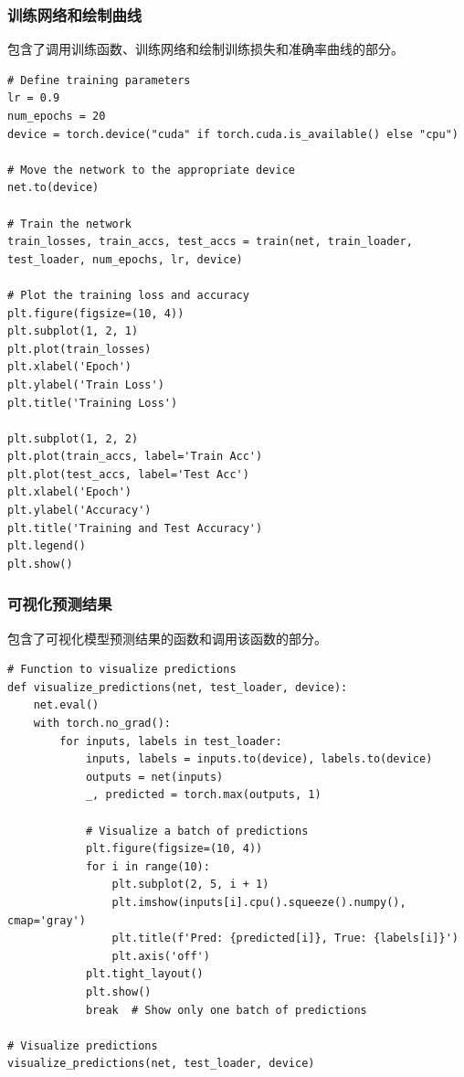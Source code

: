 \documentclass[a4paper,12pt]{article}
\begin{document}
\subsubsection{训练网络和绘制曲线}
包含了调用训练函数、训练网络和绘制训练损失和准确率曲线的部分。
\begin{lstlisting}
# Define training parameters
lr = 0.9
num_epochs = 20
device = torch.device("cuda" if torch.cuda.is_available() else "cpu")

# Move the network to the appropriate device
net.to(device)

# Train the network
train_losses, train_accs, test_accs = train(net, train_loader, test_loader, num_epochs, lr, device)

# Plot the training loss and accuracy
plt.figure(figsize=(10, 4))
plt.subplot(1, 2, 1)
plt.plot(train_losses)
plt.xlabel('Epoch')
plt.ylabel('Train Loss')
plt.title('Training Loss')

plt.subplot(1, 2, 2)
plt.plot(train_accs, label='Train Acc')
plt.plot(test_accs, label='Test Acc')
plt.xlabel('Epoch')
plt.ylabel('Accuracy')
plt.title('Training and Test Accuracy')
plt.legend()
plt.show()

\end{lstlisting}

\subsubsection{可视化预测结果}
包含了可视化模型预测结果的函数和调用该函数的部分。
\begin{lstlisting}
# Function to visualize predictions
def visualize_predictions(net, test_loader, device):
    net.eval()
    with torch.no_grad():
        for inputs, labels in test_loader:
            inputs, labels = inputs.to(device), labels.to(device)
            outputs = net(inputs)
            _, predicted = torch.max(outputs, 1)

            # Visualize a batch of predictions
            plt.figure(figsize=(10, 4))
            for i in range(10):
                plt.subplot(2, 5, i + 1)
                plt.imshow(inputs[i].cpu().squeeze().numpy(), cmap='gray')
                plt.title(f'Pred: {predicted[i]}, True: {labels[i]}')
                plt.axis('off')
            plt.tight_layout()
            plt.show()
            break  # Show only one batch of predictions

# Visualize predictions
visualize_predictions(net, test_loader, device)

\end{lstlisting}
\end{document}
